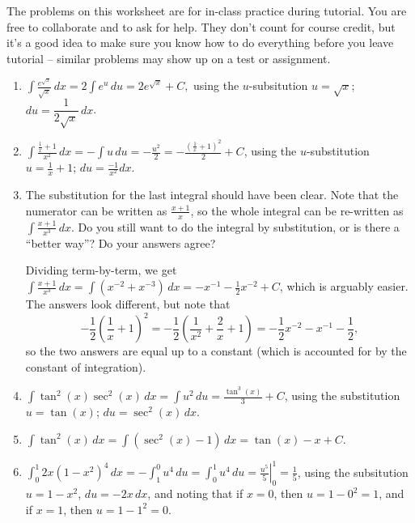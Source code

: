 \documentclass[12pt]{article}
\newcommand{\di}{\displaystyle}
\begin{document}
\thispagestyle{fancy}
The problems on this worksheet are for in-class practice during tutorial. You are free to collaborate and to ask for help. They don't count for course credit, but it's a good idea to make sure you know how to do everything before you leave tutorial -- similar problems may show up on a test or assignment.

\bigskip

 \begin{enumerate}
 \item  $\di \int \frac{e^{\sqrt{x}}}{\sqrt{x}}\,dx = 2\int e^u\,du = 2e^{\sqrt{x}}+C,$ using the $u$-subsitution $u=\sqrt{x}$; $du = \dfrac{1}{2\sqrt{x}}\,dx$.




 \item $\di \int \frac{\frac{1}{x}+1}{x^2}\,dx = -\int u\,du = -\frac{u^2}{2} = -\frac{(\frac{1}{x}+1)^2}{2}+C$, using the $u$-substitution $u=\frac{1}{x}+1$; $du = \frac{-1}{x^2}dx$.

 \item The substitution for the last integral should have been clear. Note that the numerator can be written as $\frac{x+1}{x}$, so the whole integral can be re-written as $\di \int \frac{x+1}{x^3}\,dx$. Do you still want to do the integral by substitution, or is there a ``better way''? Do your answers agree?

\bigskip

Dividing term-by-term, we get $\di\int\frac{x+1}{x^3}\,dx = \int(x^{-2}+x^{-3})\,dx = -x^{-1}-\frac{1}{2}x^{-2}+C$, which is arguably easier. The answers look different, but note that
\[
 -\frac{1}{2}\left(\frac{1}{x}+1\right)^2=-\frac{1}{2}\left(\frac{1}{x^2}+\frac{2}{x}+1\right) = -\frac{1}{2}x^{-2}-x^{-1}-\frac{1}{2},
\]
so the two answers are equal up to a constant (which is accounted for by the constant of integration).

 \item $\di \int \tan^2(x)\sec^2(x)\,dx = \int u^2\,du = \frac{\tan^3(x)}{3}+C$, using the substitution $u=\tan(x)$; $du = \sec^2(x)\,dx$.

 \item $\di \int \tan^2(x)\,dx = \int (\sec^2(x)-1)\,dx = \tan(x)-x+C$.

 \item $\di \int_0^1 2x(1-x^2)^4\,dx = -\int_1^0 u^4\,du = \int_0^1 u^4\,du = \left.\frac{u^5}{5}\right|^1_0 = \frac{1}{5}$, using the subsitution $u=1-x^2$, $du = -2x\,dx$, and noting that if $x=0$, then $u=1-0^2=1$, and if $x=1$, then $u=1-1^2=0$.


\end{enumerate}
\end{document}
